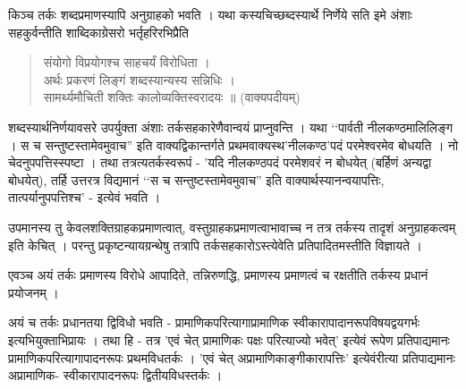 किञ्च तर्कः शब्दप्रमाणस्यापि अनुग्राहको भवति । यथा कस्यचिच्छब्दस्यार्थे निर्णेये सति इमे अंशाः सहकुर्वन्तीति शाब्दिकाग्रेसरो भर्तृहरिरभिप्रैति 
\begin{verse}
संयोगो विप्रयोगश्च साहचर्यं विरोधिता ।\\
अर्थः प्रकरणं लिङ्गं शब्दस्यान्यस्य सन्निधिः ।\\
सामर्थ्यमौचिती शक्तिः कालोव्यक्तिस्वरादयः ॥ (वाक्यपदीयम्)
\end{verse}
शब्दस्यार्थनिर्णयावसरे उपर्युक्ता अंशाः तर्कसहकारेणैवान्वयं प्राप्नुवन्ति । यथा ‘‘पार्वती नीलकण्ठमालिलिङ्ग । स च सन्तुष्टस्तामेवमुवाच'' इति वाक्यद्विकान्तर्गते प्रथमवाक्यस्थ'नीलकण्ठ'पदं परमेश्वरमेव बोधयति । नो चेदनुपपत्तिस्स्पष्टा  । तथा तत्रत्यतर्कस्वरूपं - 'यदि नीलकण्ठपदं परमेशवरं न बोधयेत् (बर्हिणं अन्यद्वा बोधयेत्), तर्हि उत्तरत्र विद्यमानं ‘‘स च सन्तुष्टस्तामेवमुवाच'' इति वाक्यार्थस्यानन्वयापत्तिः, तात्पर्यानुपपत्तिश्च' - इत्येवं भवति ।

उपमानस्य तु केवलशक्तिग्राहकप्रमाणत्वात्, वस्तुग्राहकप्रमाणत्वाभावाच्च न तत्र तर्कस्य तादृशं अनुग्राहकत्वम् इति केचित् । परन्तु प्रकृष्टन्यायग्रन्थेषु तत्रापि तर्कसहकारोऽस्त्येवेति प्रतिपादितमस्तीति विज्ञायते ।

एवञ्च अयं तर्कः प्रमाणस्य विरोधे आपादिते, तन्निरुणद्धि, प्रमाणस्य प्रमाणत्वं च रक्षतीति तर्कस्य प्रधानं प्रयोजनम् ।

अयं च तर्कः प्रधानतया द्विविधो भवति - प्रामाणिकपरित्यागाप्रामाणिक स्वीकारापादानरूपविषयद्वयगर्भः इत्यभियुक्ताभिप्रायः । तथा हि - तत्र 'एवं चेत् प्रामाणिकः पक्षः परित्याज्यो भवेत्' इत्येवं रूपेण प्रतिपाद्यमानः प्रामाणिकपरित्यागापादनरूपः प्रथमविधतर्कः । 'एवं चेत् अप्रामाणिकाङ्गीकारापत्तिः' इत्येवंरीत्या प्रतिपाद्यमानः अप्रामाणिक- स्वीकारापादनरूपः द्वितीयविधस्तर्कः । 

